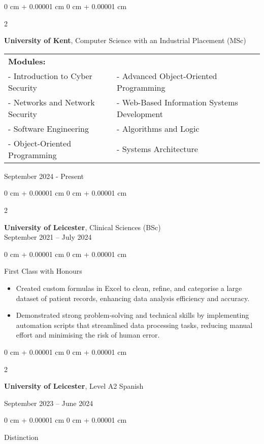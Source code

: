 \documentclass[10pt, letterpaper]{article}
\newenvironment{highlights}{
    \begin{itemize}[
        topsep=0.10 cm,
        parsep=0.10 cm,
        partopsep=0pt,
        itemsep=0pt,
        leftmargin=0 cm + 10pt
    ]
}{
    \end{itemize}
} %
\newenvironment{onecolentry}{
    \begin{adjustwidth}{
        0 cm + 0.00001 cm
    }{
        0 cm + 0.00001 cm
    }
}{
    \end{adjustwidth}
} %
\newenvironment{twocolentry}[2][]{
    \onecolentry
    \def\secondColumn{#2}
    \setcolumnwidth{\fill, 4.5 cm}
    \begin{paracol}{2}
}{
    \switchcolumn \raggedleft \secondColumn
    \end{paracol}
    \endonecolentry
} %
\begin{document}
\begin{twocolentry}{ 
   September 2024 - Present 
}
    \textbf{University of Kent}, Computer Science with an Industrial Placement (MSc) 
    \vspace{0.05 cm}
    \begin{tabular}{@{}>{\raggedright\arraybackslash}p{8cm}@{} >{\raggedright\arraybackslash}p{8cm}@{}}
        \textbf{Modules:} & \textbf{} \\
        - Introduction to Cyber Security & - Advanced Object-Oriented Programming \\
       - Networks and Network Security & - Web-Based Information Systems Development \\
        - Software Engineering & - Algorithms and Logic \\
        - Object-Oriented Programming & - Systems Architecture \\
    \end{tabular}
\end{twocolentry}


       \begin{twocolentry}{
    September 2021 – July 2024
}
 \textbf{University of Leicester}, Clinical Sciences (BSc) \\
\end{twocolentry}
\vspace{-0.15 cm} %
\begin{onecolentry}
    \begin{highlights}
        {First Class with Honours}
    \end{highlights}
     \vspace{-0.15cm}
    \begin{itemize}[leftmargin=*, itemsep=0.1em] %
        \item Created custom formulas in Excel to clean, refine, and categorise a large dataset of patient records, enhancing data analysis efficiency and accuracy.
        \item Demonstrated strong problem-solving and technical skills by implementing automation scripts that streamlined data processing tasks, reducing manual effort and minimising the risk of human error.
    \end{itemize}
\end{onecolentry}

\vspace{0.2 cm}
    \begin{twocolentry}{
    September 2023 – June 2024
}
    \textbf{University of Leicester}, Level A2 Spanish   
\end{twocolentry}
\vspace{-0.15 cm} %
\begin{onecolentry}
    \begin{highlights}
        {Distinction}
    \end{highlights}
\end{onecolentry}
\end{document}
